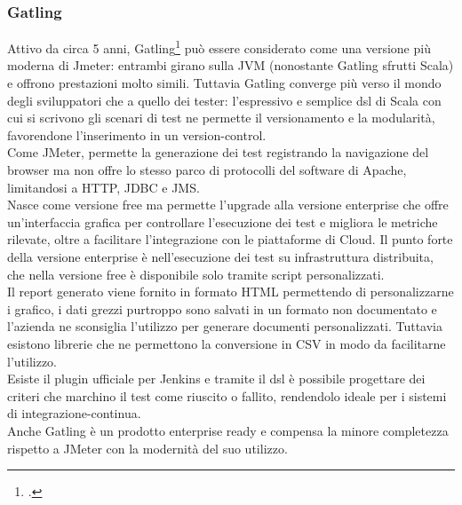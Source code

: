 \subsubsection{Gatling}
Attivo da circa 5 anni, Gatling\footcite{site:gatling} può essere considerato come una versione più moderna di Jmeter: entrambi girano sulla JVM (nonostante Gatling sfrutti Scala) e offrono prestazioni molto simili. Tuttavia Gatling converge più verso il mondo degli sviluppatori che a quello dei tester: l'espressivo e semplice \gls{dsl} di Scala con cui si scrivono gli scenari di test ne permette il versionamento e la modularità, favorendone l'inserimento in un \gls{version-control}. \\
Come JMeter, permette la generazione dei test registrando la navigazione del browser ma non offre lo stesso parco di protocolli del software di Apache, limitandosi a HTTP, JDBC e JMS. \\
Nasce come versione free ma permette l’upgrade alla versione enterprise che offre un'interfaccia grafica per controllare l'esecuzione dei test e migliora le metriche rilevate, oltre a facilitare l’integrazione con le piattaforme di Cloud. Il punto forte della versione enterprise è nell'esecuzione dei test su infrastruttura distribuita, che nella versione free è disponibile solo tramite script personalizzati. \\
Il report generato viene fornito in formato HTML permettendo di personalizzarne i grafico, i dati grezzi purtroppo sono salvati in un formato non documentato e l'azienda ne sconsiglia l'utilizzo per generare documenti personalizzati. Tuttavia esistono librerie che ne permettono la conversione in CSV in modo da facilitarne l'utilizzo.\\
Esiste il plugin ufficiale per Jenkins e tramite il \gls{dsl} è possibile progettare dei criteri che marchino il test come riuscito o fallito, rendendolo ideale per i sistemi di \gls{integrazione-continua}.\\
Anche Gatling è un prodotto enterprise ready e compensa la minore completezza rispetto a JMeter con la modernità del suo utilizzo.
